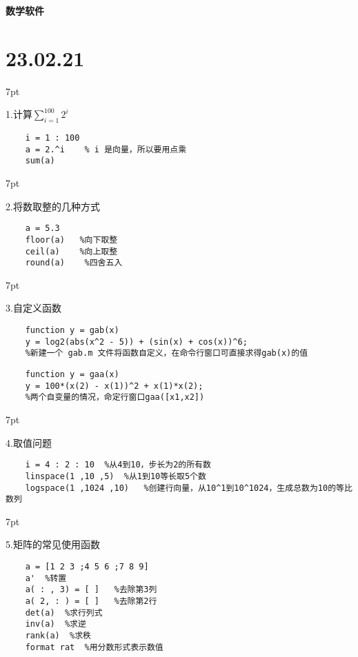 \documentclass{article} %
\newenvironment{eg}{%
\def\FrameCommand{%
\hspace{1pt}%
{\color{Gray}\vrule width 2pt}%
{\color{egshade}\vrule width 4pt}%
\colorbox{egshade}%
}%
\MakeFramed{\advance\hsize-\width\FrameRestore}%
\noindent\hspace{-4.55pt}%
\begin{adjustwidth}{}{7pt}%
\vspace{2pt}\vspace{2pt}%
\normalfont %
}
{%
\vspace{2pt}\end{adjustwidth}\endMakeFramed%
}
\begin{document}
 
\centerline{\LARGE \textbf{数学软件} }\par 

\noindent \Large \section*{23.02.21} \par \normalsize
\begin{eg}
    1.计算$\sum \limits _{i=1}^{100} 2^{i}$ \par
\end{eg}
\begin{lstlisting}
    i = 1 : 100
    a = 2.^i    % i 是向量，所以要用点乘
    sum(a)
\end{lstlisting}


\begin{eg}
    2.将数取整的几种方式
\end{eg}
\begin{lstlisting}
    a = 5.3
    floor(a)   %向下取整
    ceil(a)    %向上取整
    round(a)    %四舍五入
\end{lstlisting}

\begin{eg}
    3.自定义函数
\end{eg}
\begin{lstlisting}
    function y = gab(x)
    y = log2(abs(x^2 - 5)) + (sin(x) + cos(x))^6; 
    %新建一个 gab.m 文件将函数自定义，在命令行窗口可直接求得gab(x)的值
\end{lstlisting}
\begin{lstlisting}
    function y = gaa(x)
    y = 100*(x(2) - x(1))^2 + x(1)*x(2);
    %两个自变量的情况，命定行窗口gaa([x1,x2])
\end{lstlisting}

\begin{eg}
    4.取值问题
\end{eg}
\begin{lstlisting}
    i = 4 : 2 : 10  %从4到10，步长为2的所有数
    linspace(1 ,10 ,5)  %从1到10等长取5个数
    logspace(1 ,1024 ,10)   %创建行向量，从10^1到10^1024，生成总数为10的等比数列
\end{lstlisting}

\begin{eg}
    5.矩阵的常见使用函数
\end{eg}
\begin{lstlisting}
    a = [1 2 3 ;4 5 6 ;7 8 9]
    a'  %转置
    a( : , 3) = [ ]   %去除第3列
    a( 2, : ) = [ ]   %去除第2行
    det(a)  %求行列式
    inv(a)  %求逆
    rank(a)  %求秩
    format rat  %用分数形式表示数值
\end{lstlisting}
\par
\end{document}
